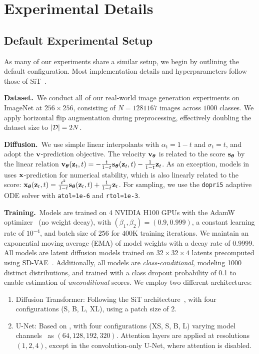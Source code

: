 \section{Experimental Details} \label{app:exp_detail}
\subsection{Default Experimental Setup} \label{app:exp_default}

As many of our experiments share a similar setup, we begin by outlining the default configuration. Most implementation details and hyperparameters follow those of SiT~\citep{ma2024sit}.

\textbf{Dataset.}~We conduct all of our real-world image generation experiments on ImageNet at $256 \times 256$, consisting of $N = 1281167$ images across $1000$ classes. We apply horizontal flip augmentation during preprocessing, effectively doubling the dataset size to $|\mathcal{D}| = 2N$.

\textbf{Diffusion.}~We use simple linear interpolants with $\alpha_t = 1 - t$ and $\sigma_t = t$, and adopt the ${\mathbf{v}}$-prediction objective. The velocity ${\mathbf{v}}_{\boldsymbol{\theta}}$ is related to the score ${\mathbf{s}}_{\boldsymbol{\theta}}$ by the linear relation ${\mathbf{v}}_{\boldsymbol{\theta}}({\mathbf{z}}_t, t) = -\frac{t}{1 - t}{\mathbf{s}}_{\boldsymbol{\theta}}({\mathbf{z}}_t, t) - \frac{1}{1-t}{\mathbf{z}}_t$. As an exception, models in  uses ${\mathbf{x}}$-prediction for numerical stability, which is also linearly related to the score: ${\mathbf{x}}_{\boldsymbol{\theta}} ({\mathbf{z}}_t, t) = \frac{t^2}{1 - t}{\mathbf{s}}_{\boldsymbol{\theta}}({\mathbf{z}}_t, t) + \frac{1}{1 - t}{\mathbf{z}}_t$.  For sampling, we use the \texttt{dopri5} adaptive ODE solver with \texttt{atol=1e-6} and \texttt{rtol=1e-3}.

\textbf{Training.}~Models are trained on 4 NVIDIA H100 GPUs with the AdamW optimizer~\citep{loshchilov2017decoupled} (no weight decay), with $(\beta_1, \beta_2) = (0.9, 0.999)$, a constant learning rate of $10^{-4}$, and batch size of $256$ for $400$K training iterations. We maintain an exponential moving average (EMA) of model weights with a decay rate of 0.9999. All models are latent diffusion models trained on $32\times32\times4$ latents precomputed using SD-VAE~\citep{rombach2022high}. Additionally, all models are \emph{class-conditional}, modeling 1000 distinct distributions, and trained with a class dropout probability of 0.1 to enable estimation of \emph{unconditional} scores. We employ two different architectures:
{\setlength{\parskip}{2pt}\begin{enumerate}[leftmargin=*,label=(\arabic*),nosep,itemsep=2pt]
    \item Diffusion Transformer: Following the SiT architecture~\citep{ma2024sit}, with four configurations (S, B, L, XL), using a patch size of 2.
    \item U-Net: Based on \citet{dhariwal2021diffusion}, with four configurations (XS, S, B, L) varying model channels~\citep{karras2024analyzing} as $(64, 128, 192, 320)$. Attention layers are applied at resolutions $(1, 2, 4)$, except in the convolution-only U-Net, where attention is disabled.
\end{enumerate}}

